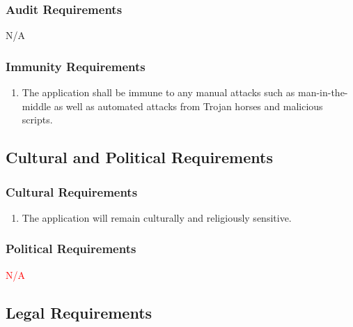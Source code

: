 \documentclass[titlepage]{article}
\newcounter{myCounter}
\begin{document}
\subsubsection{Audit Requirements}
\label{ssub:audit_requirements}
N/A

\subsubsection{Immunity Requirements}
\label{ssub:immunity_requirements}
\begin{enumerate}[{SR}1. ]
    \setcounter{enumi}{\themyCounter}
    \item The application shall be immune to any manual attacks such as man-in-the-middle as well as
    automated attacks from Trojan horses and malicious scripts.
    \setcounter{myCounter}{\theenumi}
\end{enumerate}


\subsection{Cultural and Political Requirements}
\label{sub:cultural_and_political_requirements}
\setcounter{myCounter}{0}

\subsubsection{Cultural Requirements}
\label{ssub:cultural_requirements}
\begin{enumerate}[{CP}1. ]
    \setcounter{enumi}{\themyCounter}
    \item The application will remain culturally and religiously sensitive.
    \setcounter{myCounter}{\theenumi}
\end{enumerate}

\subsubsection{Political Requirements}
\label{ssub:political_requirements}
\textcolor{red}{N/A}


\subsection{Legal Requirements}
\label{sub:legal_requirements}
\setcounter{myCounter}{0}
\end{document}
